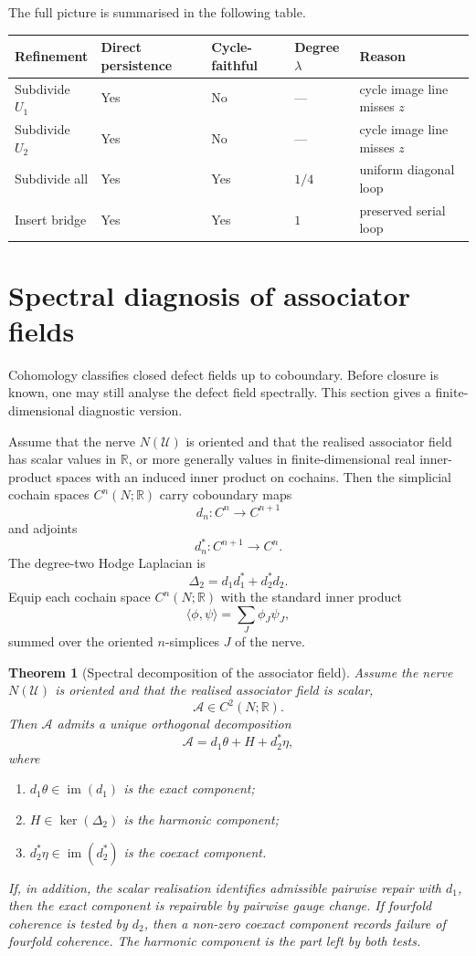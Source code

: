 \documentclass[11pt]{article}
\newtheorem{theorem}{Theorem}[section]
\newcommand{\im}{\operatorname{im}}
\newcommand{\R}{\mathbb{R}}
\begin{document}
The full picture is summarised in the following table.

\begin{center}
\begin{tabular}{lllll}
\toprule
Refinement & Direct persistence & Cycle-faithful & Degree \(\lambda\) & Reason \\
\midrule
Subdivide \(U_1\) & Yes & No & --- & cycle image line misses \(z\) \\
Subdivide \(U_2\) & Yes & No & --- & cycle image line misses \(z\) \\
Subdivide all & Yes & Yes & \(1/4\) & uniform diagonal loop \\
Insert bridge & Yes & Yes & \(1\) & preserved serial loop \\
\bottomrule
\end{tabular}
\end{center}

\section{Spectral diagnosis of associator fields}

Cohomology classifies closed defect fields up to coboundary. Before closure is known, one may still analyse the defect field spectrally. This section gives a finite-dimensional diagnostic version.

Assume that the nerve \(N(\mathcal U)\) is oriented and that the realised associator field has scalar values in \(\R\), or more generally values in finite-dimensional real inner-product spaces with an induced inner product on cochains. Then the simplicial cochain spaces \(C^n(N;\R)\) carry coboundary maps
\[
d_n:C^n\to C^{n+1}
\]
and adjoints
\[
d_n^*:C^{n+1}\to C^n.
\]
The degree-two Hodge Laplacian is
\[
\Delta_2=d_1d_1^*+d_2^*d_2.
\]
Equip each cochain space \(C^n(N;\R)\) with the standard inner product
\[
\langle \phi,\psi\rangle=
\sum_J \phi_J\psi_J,
\]
summed over the oriented \(n\)-simplices \(J\) of the nerve.

\begin{theorem}[Spectral decomposition of the associator field]
Assume the nerve \(N(\mathcal U)\) is oriented and that the realised associator field is scalar,
\[
\mathcal A\in C^2(N;\R).
\]
Then \(\mathcal A\) admits a unique orthogonal decomposition
\[
\mathcal A=d_1\theta+H+d_2^*\eta,
\]
where
\begin{enumerate}[label=(\roman*)]
\item \(d_1\theta\in \im(d_1)\) is the exact component;
\item \(H\in \ker(\Delta_2)\) is the harmonic component;
\item \(d_2^*\eta\in \im(d_2^*)\) is the coexact component.
\end{enumerate}
If, in addition, the scalar realisation identifies admissible pairwise repair with \(d_1\), then the exact component is repairable by pairwise gauge change. If fourfold coherence is tested by \(d_2\), then a non-zero coexact component records failure of fourfold coherence. The harmonic component is the part left by both tests.
\end{theorem}
\end{document}
